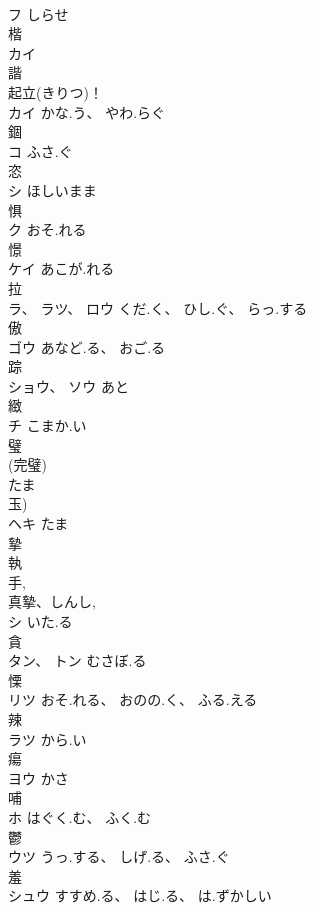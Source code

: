 \documentclass[8pt]{extreport}
\begin{document}
\begin{CJK}{UTF8}{min}
\\	フ	しらせ		
\\	楷				
\\	カイ			
\\	諧				
\\	起立(きりつ)！ 
\\	カイ	かな.う、 やわ.らぐ		
\\	錮				
\\	コ	ふさ.ぐ		
\\	恣				
\\	シ	ほしいまま		
\\	惧				
\\	ク	おそ.れる		
\\	憬				
\\	ケイ	あこが.れる		
\\	拉				
\\	ラ、 ラツ、 ロウ	くだ.く、 ひし.ぐ、 らっ.する		
\\	傲				
\\	ゴウ	あなど.る、 おご.る		
\\	踪				
\\	ショウ、 ソウ	あと		
\\	緻				
\\	チ	こまか.い		
\\	璧				
\\	(完璧) 
\\	たま 
\\	玉) 
\\	ヘキ	たま		
\\	摯				
\\	執 
\\	手, 
\\	真摯、しんし, 
\\	シ	いた.る		
\\	貪				
\\	タン、 トン	むさぼ.る		
\\	慄				
\\	リツ	おそ.れる、 おのの.く、 ふる.える		
\\	辣				
\\	ラツ	から.い		
\\	瘍				
\\	ヨウ	かさ		
\\	哺				
\\	ホ	はぐく.む、 ふく.む		
\\	鬱				
\\	ウツ	うっ.する、 しげ.る、 ふさ.ぐ		
\\	羞				
\\	シュウ	すすめ.る、 はじ.る、 は.ずかしい		
\end{CJK}
\end{document}
